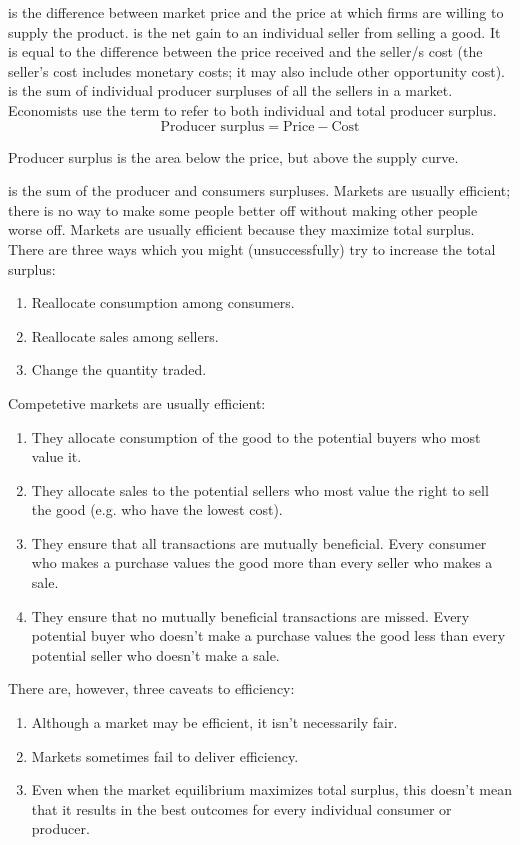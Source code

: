 \documentclass{article}
\begin{document}
 is the difference between market price and the price at which firms are willing to supply the product.  is the net gain to an individual seller from selling a good. It is equal to the difference between the price received and the seller/s cost (the seller's cost includes monetary costs; it may also include other opportunity cost).  is the sum of individual producer surpluses of all the sellers in a market. Economists use the term  to refer to both individual and total producer surplus. $$\textrm{Producer surplus} = \textrm{Price} - \textrm{Cost}$$ 

\begin{remark}
  Producer surplus is the area below the price, but above the supply curve. 
\end{remark}

 is the sum of the producer and consumers surpluses. Markets are usually efficient; there is no way to make some people better off without making other people worse off. Markets are usually efficient because they maximize total surplus. There are three ways which you might (unsuccessfully) try to increase the total surplus: 
\begin{enumerate}
  \item Reallocate consumption among consumers. 
  \item Reallocate sales among sellers. 
  \item Change the quantity traded.
\end{enumerate}

Competetive markets are usually efficient: 
\begin{enumerate}
  \item They allocate consumption of the good to the potential buyers who most value it.
  \item They allocate sales to the potential sellers who most value the right to sell the good (e.g. who have the lowest cost). 
  \item They ensure that all transactions are mutually beneficial. Every consumer who makes a purchase values the good more than every seller who makes a sale. 
  \item They ensure that no mutually beneficial transactions are missed. Every potential buyer who doesn't make a purchase values the good less than every potential seller who doesn't make a sale.
\end{enumerate}
There are, however, three caveats to efficiency:
\begin{enumerate}
  \item Although a market may be efficient, it isn't necessarily fair. 
  \item Markets sometimes fail to deliver efficiency. 
  \item Even when the market equilibrium maximizes total surplus, this doesn't mean that it results in the best outcomes for every individual consumer or producer. 
\end{enumerate}
\end{document}
